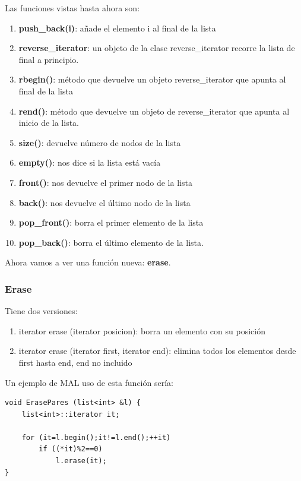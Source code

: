 \documentclass[10pt,a4paper,spanish]{report}
\begin{document}
\noindent
Las funciones vistas hasta ahora son:
\begin{enumerate}[$\heartsuit$]
\item \textbf{\textcolor[rgb]{0.2,0.5,0.5}{push\_back(i)}}: añade el elemento i al final de la lista
\item \textbf{\textcolor[rgb]{0.2,0.5,0.5}{reverse\_iterator}}: un objeto de la clase reverse\_iterator recorre la lista de final a principio.
\item \textbf{\textcolor[rgb]{0.2,0.5,0.5}{rbegin()}}: método que devuelve un objeto reverse\_iterator que apunta al final de la lista
\item \textbf{\textcolor[rgb]{0.2,0.5,0.5}{rend()}}: método que devuelve un objeto de reverse\_iterator que apunta al inicio de la lista.
\item \textbf{\textcolor[rgb]{0.2,0.5,0.5}{size()}}: devuelve número de nodos de la lista
\item \textbf{\textcolor[rgb]{0.2,0.5,0.5}{empty()}}: nos dice si la lista está vacía
\item \textbf{\textcolor[rgb]{0.2,0.5,0.5}{front()}}: nos devuelve el primer nodo de la lista
\item \textbf{\textcolor[rgb]{0.2,0.5,0.5}{back()}}: nos devuelve el último nodo de la lista
\item \textbf{\textcolor[rgb]{0.2,0.5,0.5}{pop\_front()}}: borra el primer elemento de la lista
\item \textbf{\textcolor[rgb]{0.2,0.5,0.5}{pop\_back()}}: borra el último elemento de la lista.
\end{enumerate}

\noindent
Ahora vamos a ver una función nueva: \textbf{\textcolor[rgb]{0.2,0.5,0.5}{erase}}.

\subsubsection{\textcolor[rgb]{0.2,0.5,0.5}Erase}
\noindent
Tiene dos versiones:

\begin{enumerate}[$\longrightarrow$]
\item iterator erase (iterator posicion): borra un elemento con su posición
\item iterator erase (iterator first, iterator end): elimina todos los elementos desde first hasta end, end no incluido
\end{enumerate}

\noindent
Un ejemplo de MAL uso de esta función sería:
\begin{verbatim}
void ErasePares (list<int> &l) {
    list<int>::iterator it;

    for (it=l.begin();it!=l.end();++it)
        if ((*it)%2==0)
            l.erase(it);
}
\end{verbatim}
\end{document}
